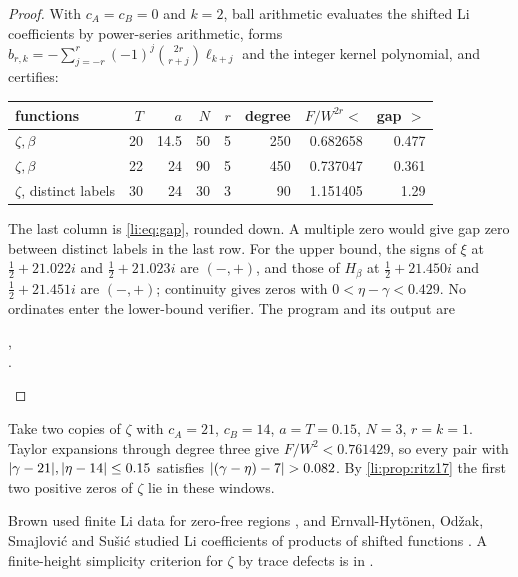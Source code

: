 \begin{proof}
With $c_A=c_B=0$ and $k=2$, ball arithmetic evaluates the shifted Li coefficients by power-series
arithmetic, forms $b_{r,k}=-\sum_{j=-r}^r(-1)^j\binom{2r}{r+j}\ell_{k+j}$ and the integer kernel
polynomial, and certifies:
\begin{center}\small
\begin{tabular}{@{}lrrrrrrr@{}}
\toprule
functions & $T$ & $a$ & $N$ & $r$ & degree & $F/W^{2r}<$ & gap $>$\\
\midrule
$\zeta,\beta$ & 20 & 14.5 & 50 & 5 & 250 & 0.682658 & 0.477\\
$\zeta,\beta$ & 22 & 24 & 90 & 5 & 450 & 0.737047 & 0.361\\
$\zeta$, distinct labels & 30 & 24 & 30 & 3 & 90 & 1.151405 & 1.29\\
\bottomrule
\end{tabular}
\end{center}
The last column is \eqref{li:eq:gap}, rounded down. A multiple zero would give gap zero between
distinct labels in the last row. For the upper bound, the signs of $\xi$ at $\frac12+21.022i$ and
$\frac12+21.023i$ are $(-,+)$, and those of $H_\beta$ at $\frac12+21.450i$ and $\frac12+21.451i$ are
$(-,+)$; continuity gives zeros with $0<\eta-\gamma<0.429$. No ordinates enter the lower-bound
verifier. The program and its output are
\begin{center}
,\\
.
\end{center}
\end{proof}

\begin{example}\label{li:ex:shifted}
Take two copies of $\zeta$ with $c_A=21$, $c_B=14$, $a=T=0.15$, $N=3$, $r=k=1$. Taylor expansions
through degree three give $F/W^2<0.761429$, so every pair with $\lvert\gamma-21\rvert,\lvert\eta-14\rvert\le0.15$
satisfies $\lvert(\gamma-\eta)-7\rvert>0.082$. By \cref{li:prop:ritz17} the first two positive zeros of
$\zeta$ lie in these windows.
\end{example}

Brown used finite Li data for zero-free regions \cite{Brown2005Li}, and Ernvall-Hyt\"onen,
Od\v{z}ak, Smajlovi\'c and Su\v{s}i\'c studied Li coefficients of products of shifted functions
\cite{ErnvallHytonenOdzakSmajlovicSusic2015Modified}. A finite-height simplicity criterion for $\zeta$
by trace defects is in \cite{Alderliefste2026Finite}.

